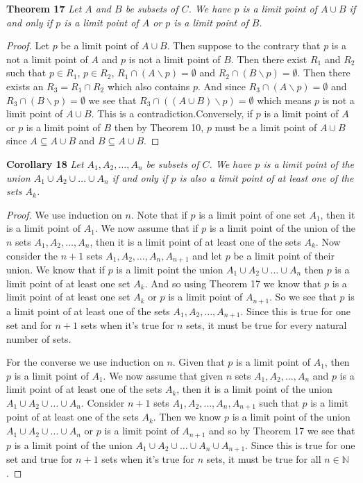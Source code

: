 \documentclass{article}
\begin{document}
\begin{flushleft}
\textbf{Theorem 17}
\textsl{Let $A$ and $B$ be subsets of $C$. We have $p$ is a limit point of $A \cup B$ if and only if $p$ is a limit point of $A$ or $p$ is a limit point of $B$.}
\begin{proof}
Let $p$ be a limit point of $A \cup B$. Then suppose to the contrary that $p$ is a not a limit point of $A$ and $p$ is not a limit point of $B$. Then there exist $R_1$ and $R_2$ such that $p \in R_1$, $p \in R_2$, $R_1 \cap (A \backslash p) = \emptyset$ and $R_2 \cap (B \backslash p) = \emptyset$. Then there exists an $R_3 = R_1 \cap R_2$ which also contains $p$. And since $R_3 \cap (A \backslash p) = \emptyset$ and $R_3 \cap (B \backslash p) = \emptyset$ we see that $R_3 \cap ((A \cup B) \backslash p) = \emptyset$ which means $p$ is not a limit point of $A \cup B$. This is a contradiction.Conversely, if $p$ is a limit point of $A$ or $p$ is a limit point of $B$ then by Theorem 10, $p$ must be a limit point of $A \cup B$ since $A \subseteq A \cup B$ and $B \subseteq A \cup B$.
\end{proof}

\textbf{Corollary 18}
\textsl{Let $A_1,A_2, \dots ,A_n$ be subsets of $C$. We have $p$ is a limit point of the union $A_1 \cup A_2 \cup \dots \cup A_n$ if and only if $p$ is also a limit point of at least one of the sets $A_k$.}
\begin{proof}
We use induction on $n$. Note that if $p$ is a limit point of one set $A_1$, then it is a limit point of $A_1$. We now assume that if $p$ is a limit point of the union of the $n$ sets $A_1,A_2, \dots ,A_n$, then it is a limit point of at least one of the sets $A_k$. Now consider the $n+1$ sets $A_1,A_2, \dots ,A_n, A_{n+1}$ and let $p$ be a limit point of their union. We know that if $p$ is a limit point the union $A_1 \cup A_2 \cup \dots \cup A_n$ then $p$ is a limit point of at least one set $A_k$. And so using Theorem 17 we know that $p$ is a limit point of at least one set $A_k$ or $p$ is a limit point of $A_{n+1}$. So we see that $p$ is a limit point of at least one of the sets $A_1, A_2, \dots ,A_{n+1}$. Since this is true for one set and for $n+1$ sets when it's true for $n$ sets, it must be true for every natural number of sets.\newline

For the converse we use induction on $n$. Given that $p$ is a limit point of $A_1$, then $p$ is a limit point of $A_1$. We now assume that given $n$ sets $A_1,A_2, \dots ,A_n$ and $p$ is a limit point of at least one of the sets $A_k$, then it is a limit point of the union $A_1 \cup A_2 \cup \dots \cup A_n$. Consider $n+1$ sets $A_1, A_2, \dots ,A_n, A_{n+1}$ such that $p$ is a limit point of at least one of the sets $A_k$. Then we know $p$ is a limit point of the union $A_1 \cup A_2 \cup \dots \cup A_n$ or $p$ is a limit point of $A_{n+1}$ and so by Theorem 17 we see that $p$ is a limit point of the union $A_1 \cup A_2 \cup \dots \cup A_n \cup A_{n+1}$. Since this is true for one set and true for $n+1$ sets when it's true for $n$ sets, it must be true for all $n \in \mathbb{N}$.
\end{proof}


\end{flushleft}
\end{document}
